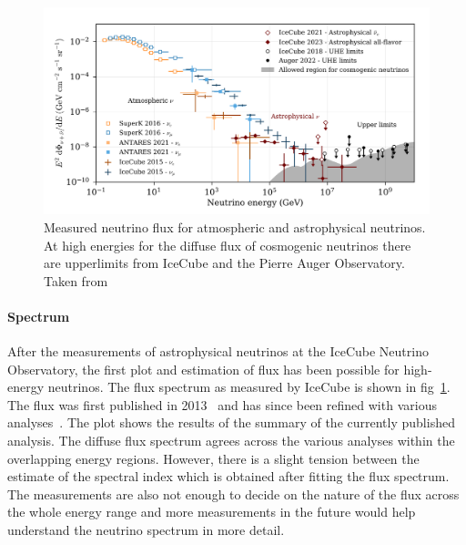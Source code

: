 \begin{figure}[t!]
  \centering
  \includegraphics[width=14.5cm]{thesis_figures/CRnNu/Nu_flux_measurement.png}
  \caption{Measured neutrino flux for atmospheric and astrophysical neutrinos. At high energies for the diffuse flux of cosmogenic neutrinos there are upperlimits from IceCube and the Pierre Auger Observatory. Taken from~\cite{ParticleDataGroup:2024cfk}}
  \label{fig:Nu_flux_measurement}
\end{figure}

  \paragraph*{Spectrum}
  \label{subsubsec:Nuspectrum}
  After the measurements of astrophysical neutrinos at the IceCube Neutrino Observatory, the first plot and estimation of flux has been possible for high-energy neutrinos. The flux spectrum as measured by IceCube is shown in fig~\ref{fig:Nu_flux_measurement}. The flux was first published in 2013~\cite{Aartsen_2014_first_flux} and has since been refined with various analyses~\cite{PhysRevD.110.022001}. The plot shows the results of the summary of the currently published analysis. The diffuse flux spectrum agrees across the various analyses within the overlapping energy regions. However, there is a slight tension between the estimate of the spectral index which is obtained after fitting the flux spectrum. The measurements are also not enough to decide on the nature of the flux across the whole energy range and more measurements in the future would help understand the neutrino spectrum in more detail. 

